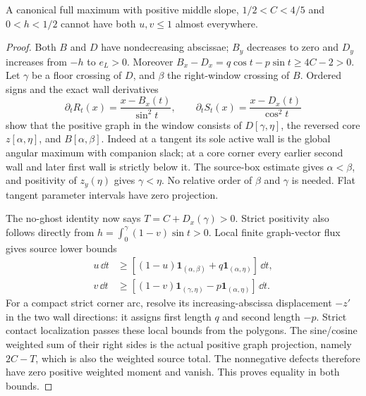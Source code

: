 \begin{lemma}\label{lem:tilted-two-unit}
A canonical full maximum with positive middle slope,
$1/2<C<4/5$ and $0<h<1/2$ cannot have both $u,v\le1$
almost everywhere.
\end{lemma}
\begin{proof}
Both $B$ and $D$ have nondecreasing abscissae; $B_y$ decreases
to zero and $D_y$ increases from $-h$ to $e_L>0$.
Moreover
$B_x-D_x=q\cos t-p\sin t\ge4C-2>0$.
Let $\gamma$ be a floor crossing of $D$, and $\beta$ the
right-window crossing of $B$. Ordered signs and the exact wall
derivatives
\[
 \partial_tR_t(x)=\frac{x-B_x(t)}{\sin^2t},\qquad
 \partial_tS_t(x)=\frac{x-D_x(t)}{\cos^2t}
\]
show that the positive graph in the window consists of
$D[\gamma,\eta]$, the reversed core $z[\alpha,\eta]$,
and $B[\alpha,\beta]$. Indeed at a tangent its sole active
wall is the global angular maximum with companion slack;
at a core corner every earlier second wall and later first
wall is strictly below it. The source-box estimate gives
$\alpha<\beta$, and positivity of $z_y(\eta)$ gives
$\gamma<\eta$. No relative order of $\beta$ and $\gamma$
is needed. Flat tangent parameter intervals have zero projection.

The no-ghost identity now says
$T=C+D_x(\gamma)>0$. Strict positivity also follows directly
from $h=\int_0^\gamma(1-v)\sin t>0$.
Local finite graph-vector flux gives source lower bounds
\[
 \begin{split}
 u\,\dd t&\ge[(1-u)\mathbf1_{(\alpha,\beta)}
                             +q\mathbf1_{(\alpha,\eta)}]\,\dd t,\\
 v\,\dd t&\ge[(1-v)\mathbf1_{(\gamma,\eta)}
                             -p\mathbf1_{(\alpha,\eta)}]\,\dd t.
 \end{split}
\]
For a compact strict corner arc, resolve its increasing-abscissa
displacement $-z'$ in the two wall directions: it assigns first
length $q$ and second length $-p$. Strict contact localization
passes these local bounds from the polygons. The sine/cosine
weighted sum of their right sides is the actual positive graph
projection, namely $2C-T$, which is also the weighted source
total. The nonnegative defects therefore have zero positive
weighted moment and vanish. This proves equality in both bounds.


\end{proof}
